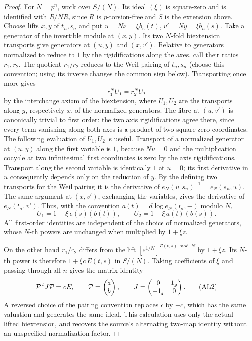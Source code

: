 \begin{proof}
For \(N=p^n\), work over \(S/(N)\). Its ideal \((\xi)\) is
square-zero and is identified with \(R/NR\), since \(R\)
is \(p\)-torsion-free and \(S\) is the extension above.
Choose lifts \(x,y\) of \(t_n,s_n\) and put
\(u=Nx=\xi b_n(t)\), \(v'=Ny=\xi b_n(s)\).
Take a generator of the invertible module at \((x,y)\).
Its two \(N\)-fold biextension transports give generators at
\((u,y)\) and \((x,v')\). Relative to generators normalized to
reduce to \(1\) by the rigidifications along the axes, call
their ratios \(r_1,r_2\).
The quotient \(r_1/r_2\) reduces to the Weil pairing of
\(t_n,s_n\) (choose this convention; using its inverse changes
the common sign below). Transporting once more gives
\[
 r_1^N U_1=r_2^N U_2
\]
by the interchange axiom of the biextension, where \(U_1,U_2\)
are the transports along \(y\), respectively \(x\), of the
normalized generators. The fibre at \((u,v')\) is canonically
trivial to first order: the two axis rigidifications agree
there, since every term vanishing along both axes is a product
of two square-zero coordinates. The following evaluation of
\(U_1,U_2\) is useful. Transport of a normalized generator at
\((u,y)\) along the first variable is \(1\), because \(Nu=0\)
and the multiplication cocycle at two infinitesimal first
coordinates is zero by the axis rigidifications. Transport
along the second variable is identically \(1\) at \(u=0\);
its first derivative in \(u\) consequently depends only on
the reduction of \(y\). By the defining two transports for
the Weil pairing it is the derivative of
\(e_N(u,s_n)^{-1}=e_N(s_n,u)\).
The same argument at \((x,v')\), exchanging the variables,
gives the derivative of \(e_N(t_n,v')\). Thus, with the
convention \(a(t)=d\log e_N(t_n,-)\) modulo \(N\),
\[
 U_1=1+\xi\,a(s)(b(t)),\qquad
 U_2=1+\xi\,a(t)(b(s)).
\]
All first-order identities are independent of the choice of
normalized generators, whose \(N\)-th powers are unchanged
when multiplied by \(1+\xi z\).

On the other hand \(r_1/r_2\) differs from the lift
\([\varepsilon^{1/N}]^{E(t,s)\bmod N}\) by \(1+\xi z\).
Its \(N\)-th power is therefore
\(1+\xi c\,E(t,s)\) in \(S/(N)\).
Taking coefficients of \(\xi\) and passing through all \(n\)
gives the matrix identity
\[
 {\cal P}^{\,t}J{\cal P}=cE,\qquad
 {\cal P}=\begin{pmatrix}a\\ b\end{pmatrix},\qquad
 J=\begin{pmatrix}0&1_g\\-1_g&0\end{pmatrix}.            \tag{AL2}
\]
A reversed choice of the pairing convention replaces \(c\)
by \(-c\), which has the same valuation and generates the
same ideal. This calculation uses only the actual lifted
biextension, and recovers the source's alternating two-map
identity without an unspecified normalization factor.


\end{proof}
